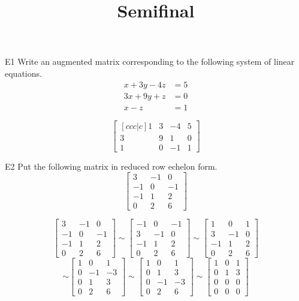 \documentclass{sbgLAsemi}
\title{Semifinal}
\begin{document}
\begin{problem}{E1}
Write an augmented matrix corresponding to the following system of linear equations.
\begin{align*}
x+3y-4z &= 5 \\
3x+9y+z &= 0 \\
x-z &= 1
\end{align*}
\end{problem}
\begin{solution}
\[
\begin{bmatrix}[ccc|c]
1 & 3 & -4 & 5 \\
3 & 9 & 1 & 0 \\
1 & 0 & -1 & 1
\end{bmatrix}
\]
\end{solution}

\begin{problem}{E2}
Put the following matrix in reduced row echelon form.
$$\begin{bmatrix}
 3 & -1 & 0 \\
 -1 & 0 & -1 \\
 -1 & 1 & 2 \\
 0 & 2 & 6
\end{bmatrix}$$
\end{problem}
\begin{solution}
$$\begin{bmatrix}
 3 & -1 & 0 \\
 -1 & 0 & -1 \\
 -1 & 1 & 2 \\
 0 & 2 & 6
\end{bmatrix}
\sim
\begin{bmatrix}
 -1 & 0 & -1 \\
 3 & -1 & 0 \\
 -1 & 1 & 2 \\
 0 & 2 & 6
\end{bmatrix}
\sim
\begin{bmatrix}
 1 & 0 & 1 \\
 3 & -1 & 0 \\
 -1 & 1 & 2 \\
 0 & 2 & 6
\end{bmatrix}
$$
$$
\sim
\begin{bmatrix}
 1 & 0 & 1 \\
 0 & -1 & -3 \\
 0 & 1 & 3 \\
 0 & 2 & 6
\end{bmatrix}
\sim
\begin{bmatrix}
 1 & 0 & 1 \\
 0 & 1 & 3 \\
 0 & -1 & -3 \\
 0 & 2 & 6
\end{bmatrix}
\sim
\begin{bmatrix}
 1 & 0 & 1 \\
 0 & 1 & 3 \\
 0 & 0 & 0 \\
0 & 0 & 0
\end{bmatrix}$$
\end{solution}
\end{document}
